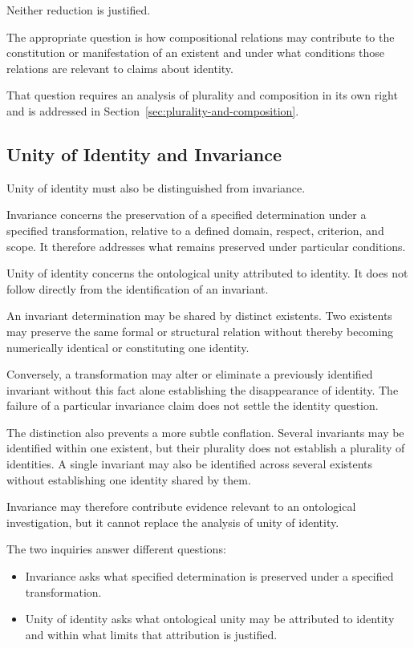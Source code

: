 Neither reduction is justified.

The appropriate question is how compositional
relations may contribute to the constitution
or manifestation of an existent and under what
conditions those relations are relevant to claims
about identity.

That question requires an analysis of plurality
and composition in its own right and is addressed
in Section~\ref{sec:plurality-and-composition}.

\subsection{Unity of Identity and Invariance}

Unity of identity must also be distinguished
from invariance.

Invariance concerns the preservation of a specified
determination under a specified transformation,
relative to a defined domain, respect, criterion,
and scope. It therefore addresses what remains
preserved under particular conditions.

Unity of identity concerns the ontological unity
attributed to identity. It does not follow directly
from the identification of an invariant.

An invariant determination may be shared by distinct
existents. Two existents may preserve the same
formal or structural relation without thereby
becoming numerically identical or constituting
one identity.

Conversely, a transformation may alter or eliminate
a previously identified invariant without this
fact alone establishing the disappearance of
identity. The failure of a particular invariance
claim does not settle the identity question.

The distinction also prevents a more subtle
conflation. Several invariants may be identified
within one existent, but their plurality does
not establish a plurality of identities. A single
invariant may also be identified across several
existents without establishing one identity
shared by them.

Invariance may therefore contribute evidence
relevant to an ontological investigation, but
it cannot replace the analysis of unity of identity.

The two inquiries answer different questions:

\begin{itemize}
    \item Invariance asks what specified determination
    is preserved under a specified transformation.

    \item Unity of identity asks what ontological
    unity may be attributed to identity and within
    what limits that attribution is justified.
\end{itemize}

